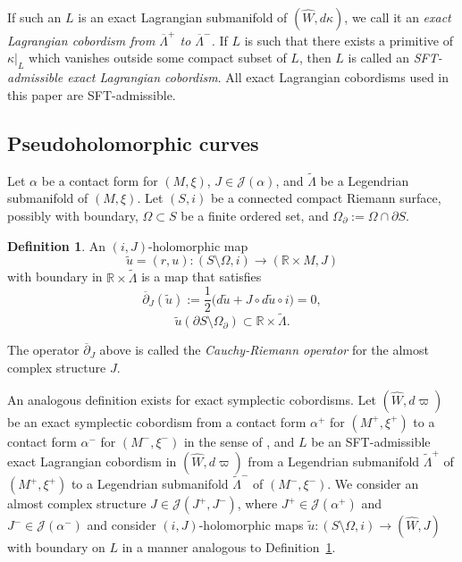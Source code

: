 \documentclass[JEP,XML,SOM,Unicode,NoFloatCountersInSection]{cedram}
\let\mathcal\mathscr
\let\wh\widehat
\theoremstyle{plain}
\theoremstyle{definition}
\newtheorem{defn}[thm]{Definition}
\numberwithin{equation}{subsection}
\begin{document}
If such an $L$ is an exact Lagrangian submanifold of $(\widehat W,d\kappa)$, we call it an {\em exact Lagrangian cobordism from $\overline{\Lambda}^+$ to $\overline{\Lambda}^-$.}
If $L$ is such that there exists a primitive of $\kappa |_L$ which vanishes outside some compact subset of $L$, then $L$ is called an \textit{SFT-admissible exact Lagrangian cobordism}. All exact Lagrangian cobordisms used in this paper are SFT-admissible.

\subsection{Pseudoholomorphic curves}

Let $\alpha$ be a contact form for $(M,\xi)$, $J \in \mathcal{J}(\alpha)$, and $\widetilde{\Lambda}$ be a Legendrian submanifold of $(M,\xi)$. Let $(S,i)$ be a connected compact Riemann surface, possibly with boundary, $\Omega \subset S$ be a finite ordered set, and $\Omega_{\partial} := \Omega \cap \partial S $.

\begin{defn} \label{defn: holo}
An $(i,J)$-holomorphic map
$$\widetilde{u}= (r,u):(S \setminus \Omega,i) \to (\mathbb{R} \times M,J)$$
with boundary in $\mathbb{R}\times \widetilde{\Lambda}$ is a map that satisfies
$$\overline{\partial}_J(\widetilde{u}):= \frac{1}{2}\big(d\widetilde{u} + J \circ d\widetilde{u} \circ i \big)=0,$$
$$\widetilde{u}(\partial S \setminus \Omega_{\partial}) \subset \mathbb{R}\times \widetilde{\Lambda}.$$
\end{defn}

The operator $\overline{\partial}_J$ above is called the {\em Cauchy-Riemann operator} for the almost complex structure $J$.

An analogous definition exists for exact symplectic cobordisms. Let $(\wh W,d\varpi)$ be an exact symplectic cobordism from a contact form $\alpha^+$ for $(M^+,\xi^+)$ to a contact form $\alpha^-$ for $(M^-,\xi^-)$ in the sense of \cite{CPT}, and $L$ be an SFT-admissible exact Lagrangian cobordism in $(\wh W,d\varpi)$ from a Legendrian submanifold $\widetilde{\Lambda}^+$ of $(M^+,\xi^+)$ to a Legendrian submanifold $\widetilde{\Lambda}^-$ of $(M^-,\xi^-)$.
We consider an almost complex structure $J \in \mathcal{J}(J^+,J^-)$, where $J^+ \in \mathcal{J}(\alpha^+)$ and $J^- \in \mathcal{J}(\alpha^-)$ and consider $(i,J)$-holomorphic maps $\widetilde{u}: (S\setminus \Omega,i)\to (\widehat {W},J)$ with boundary on $L$ in a manner analogous to Definition~\ref{defn: holo}.
\end{document}

